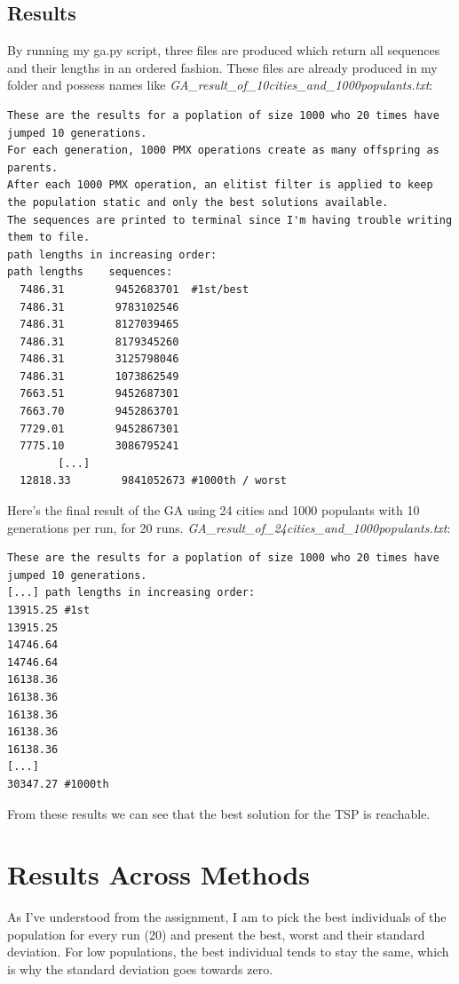\documentclass[10pt, a4paper]{article}
\begin{document}
\subsection{Results}
By running my ga.py script, three files are produced which return all sequences and their lengths in an ordered fashion. These files are already produced in my folder and possess names like \emph{GA\_result\_of\_10cities\_and\_1000populants.txt}:
\\
\begin{lstlisting}
These are the results for a poplation of size 1000 who 20 times have jumped 10 generations.
For each generation, 1000 PMX operations create as many offspring as parents.
After each 1000 PMX operation, an elitist filter is applied to keep the population static and only the best solutions available. 
The sequences are printed to terminal since I'm having trouble writing them to file.
path lengths in increasing order: 
path lengths    sequences: 
  7486.31        9452683701  #1st/best
  7486.31        9783102546
  7486.31        8127039465
  7486.31        8179345260
  7486.31        3125798046
  7486.31        1073862549
  7663.51        9452687301
  7663.70        9452863701
  7729.01        9452867301
  7775.10        3086795241
	    [...]
  12818.33        9841052673 #1000th / worst
\end{lstlisting}
Here's the final result of the GA using 24 cities and 1000 populants with 10 generations per run, for 20 runs. \emph{GA\_result\_of\_24cities\_and\_1000populants.txt}:

\begin{lstlisting}
These are the results for a poplation of size 1000 who 20 times have jumped 10 generations.
[...] path lengths in increasing order: 
13915.25 #1st
13915.25
14746.64
14746.64
16138.36
16138.36
16138.36
16138.36
16138.36
[...]
30347.27 #1000th
\end{lstlisting}

From these results we can see that the best solution for the TSP is reachable.
\clearpage
\section{Results Across Methods}
As I've understood from the assignment, I am to pick the best individuals of the population for every run (20) and present the best, worst and their standard deviation.
For low populations, the best individual tends to stay the same, which is why the standard deviation goes towards zero. 
\end{document}
